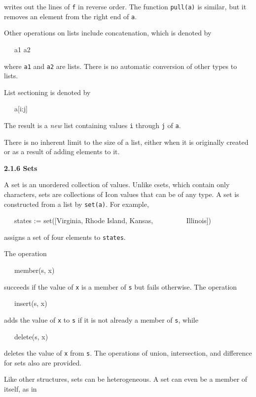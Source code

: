 \noindent writes out the lines of \texttt{f} in reverse order. The
function \texttt{pull(a)} is similar, but it removes an element from
the right end of \texttt{a}.

Other operations on lists include concatenation, which is denoted by

{\ttfamily\mdseries
\ \ \ a1 {\textbar}{\textbar}{\textbar} a2}

\noindent where \texttt{a1} and \texttt{a2} are lists. There is no
automatic conversion of other types to lists.

List sectioning is denoted by

{\ttfamily
\ \ \ a[i:j]}

The result is a \textit{new} list containing values \texttt{i} through
\texttt{j} of \texttt{a}.

There is no inherent limit to the size of a list, either when it is
originally created or as a result of adding elements to it.

{\sffamily\bfseries
2.1.6 Sets}

A set is an unordered collection of values. Unlike csets, which
contain only characters, sets are collections of Icon values that can
be of any type. A set is constructed from a list by
\texttt{set(a)}. For example,

{\ttfamily\mdseries
\ \ \ states := set([{\textquotedbl}Virginia{\textquotedbl}, {\textquotedbl}Rhode Island{\textquotedbl},
{\textquotedbl}Kansas{\textquotedbl}, \ \ \ \ \ \ \ \  \ {\textquotedbl}Illinois{\textquotedbl}])}

\noindent
assigns a set of four elements to \texttt{states}.

The operation

{\ttfamily\mdseries
\ \ \ member(s, x)}

\noindent
succeeds if the value of \texttt{x} is a member of \texttt{s} but
fails otherwise. The operation

{\ttfamily\mdseries
\ \ \ insert(s, x)}

\noindent
adds the value of \texttt{x} to \texttt{s} if it is not already a
member of \texttt{s}, while

{\ttfamily
\ \ \ delete(s, x)}

\noindent
deletes the value of \texttt{x} from \texttt{s}. The operations of
union, intersection, and difference for sets also are provided.

Like other structures, sets can be heterogeneous. A set can even be a
member of itself, as in

